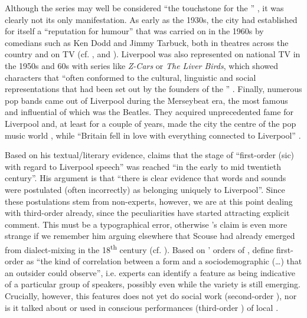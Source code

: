 Although the series may well be considered ``the touchstone for the '' \citep[79]{crowley2012}, it was clearly not its only manifestation.
As early as the 1930s, the city had established for itself a ``reputation for humour'' that was carried on in the 1960s by comedians such as Ken Dodd and Jimmy Tarbuck, both in theatres across the country and on TV (cf. \citealt[423]{murden2006}, and \citealp[49]{belchem2006a}).
Liverpool was also represented on national TV in the 1950s and 60s with series like \emph{Z-Cars} or \emph{The Liver Birds}, which showed characters that ``often conformed to the cultural, linguistic and social representations that had been set out by the founders of the '' \parencite[75]{crowley2012}.
Finally, numerous pop bands came out of Liverpool during the Merseybeat era, the most famous and influential of which was the Beatles.
They acquired unprecedented fame for Liverpool and, at least for a couple of years, made the city the centre of the pop music world \citep[cf.][75]{crowley2012}, while ``Britain fell in love with everything connected to Liverpool'' \citep[423]{murden2006}.

Based on his textual/literary evidence, \citet[107]{crowley2012} claims that the stage of ``first-order (sic)  with regard to Liverpool speech'' was reached ``in the early to mid twentieth century''.
His argument is that ``there is clear evidence that words and sounds were postulated (often incorrectly) as belonging uniquely to Liverpool''.
Since these postulations stem from non-experts, however, we are at this point dealing with third-order  already, since the peculiarities have started attracting explicit comment.
This must be a typographical error, otherwise \citeauthor{crowley2012}'s claim is even more strange if we remember him arguing elsewhere that Scouse had already emerged from dialect-mixing in the 18\textsuperscript{th} century (cf. ).
Based on \citeauthor{silverstein2003}' \citeyear{silverstein2003} orders of , \textcite[81]{johnstoneetal2006} define first-order  as ``the kind of correlation between a form and a sociodemographic  (\ldots) that an outsider could observe'', i.e. experts can identify a feature as being indicative of a particular group of speakers, possibly even while the variety is still emerging.
Crucially, however, this features does not yet do social work (second-order ), nor is it talked about or used in conscious performances (third-order ) of local  \parencite[cf.][83--84]{johnstoneetal2006}.

